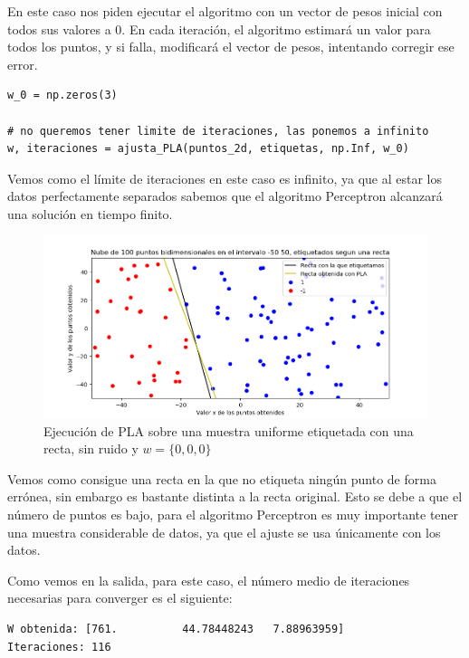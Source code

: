 \documentclass[12pt, spanish]{article}
\begin{document}
En este caso nos piden ejecutar el algoritmo con un vector de pesos inicial con todos sus valores a 0. En cada iteración, el algoritmo estimará un valor para todos los puntos, y si falla, modificará el vector de pesos, intentando corregir ese error.

\begin{lstlisting}
w_0 = np.zeros(3)

# no queremos tener limite de iteraciones, las ponemos a infinito
w, iteraciones = ajusta_PLA(puntos_2d, etiquetas, np.Inf, w_0)
\end{lstlisting}

Vemos como el límite de iteraciones en este caso es infinito, ya que al estar los datos perfectamente separados sabemos que el algoritmo Perceptron alcanzará una solución en tiempo finito.

\begin{figure}[H]
  \centering
      \includegraphics[scale = 0.70]{ej-2-PLA.png}
 		 \caption{Ejecución de PLA sobre una muestra uniforme etiquetada con una recta, sin ruido y $w = \{0, 0, 0\}$}
  		\label{fig:ej2-PLA}

\end{figure}

Vemos como consigue una recta en la que no etiqueta ningún punto de forma errónea, sin embargo es bastante distinta a la recta original. Esto se debe a que el número de puntos es bajo, para el algoritmo Perceptron es muy importante tener una muestra considerable de datos, ya que el ajuste se usa únicamente con los datos.

Como vemos en la salida, para este caso, el número medio de iteraciones necesarias para converger es el siguiente:

\begin{lstlisting}
W obtenida: [761.          44.78448243   7.88963959]
Iteraciones: 116
\end{lstlisting}
\end{document}
